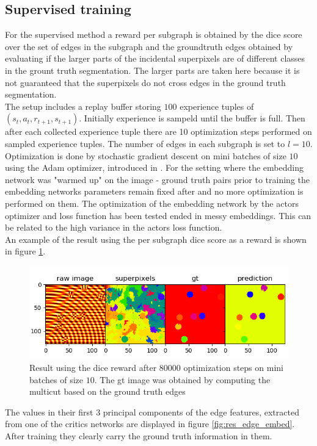\subsection{Supervised training}
For the supervised method a reward per subgraph is obtained by the dice score over the set of edges in the subgraph and the groundtruth edges obtained by evaluating if the larger parts of the incidental superpixels are of different classes in the grount truth segmentation. The larger parts are taken here because it is not guaranteed that the superpixels do not cross edges in the ground truth segmentation.\\
The setup includes a replay buffer storing $100$ experience tuples of $(s_t, a_t, r_{t+1}, s_{t+1})$. Initially experience is sampeld until the buffer is full. Then after each collected experience tuple there are 10 optimization steps performed on sampled experience tuples. The number of edges in each subgraph is set to $l=10$. Optimization is done by stochastic gradient descent on mini batches of size $10$ using the Adam optimizer, introduced in \cite{kingma2014adam}. For the setting where the embedding network was "warmed up" on the image - ground truth pairs prior to training the embedding networks parameters remain fixed after and no more optimization is performed on them. The optimization of the embedding network by the actors optimizer and loss function has been tested ended in messy embeddings. This can be related to the high variance in the actors loss function.\\
An example of the result using the per subgraph dice score as a reward is shown in figure \ref{fig:resa_dice}.\\

\begin{figure}[ht!]
	\centering
	\includegraphics[width=.7\textwidth]{figures/plots/results_dice_reward.png}
	\caption{Result using the dice reward after $80000$ optimization steps on mini batches of size $10$. The gt image was obtained by computing the multicut based on the ground truth edges}
	\label{fig:resa_dice}
\end{figure}

The values in their first $3$ principal components of the edge features, extracted from one of the critics networks are displayed in figure \ref{fig:res_edge_embed}. After training they clearly carry the ground truth information in them.\\


